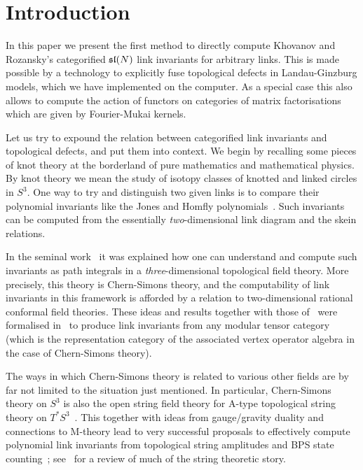\documentclass{compositio}
\theoremstyle{definition}
\numberwithin{equation}{section}
\begin{document}
\maketitle

\section{Introduction}

In this paper we present the first method to directly compute Khovanov and Rozansky's categorified $\mathfrak{sl}(N)$ link invariants for arbitrary links. This is made possible by a technology to explicitly fuse topological defects in Landau-Ginzburg models, which we have implemented on the computer. As a special case this also allows to compute the action of functors on categories of matrix factorisations which are given by Fourier-Mukai kernels. 

Let us try to expound the relation between categorified link invariants and topological defects, and put them into context. We begin by recalling some pieces of knot theory at the borderland of pure mathematics and mathematical physics. By knot theory we mean the study of isotopy classes of knotted and linked circles in $S^3$. One way to try and distinguish two given links is to compare their polynomial invariants like the Jones and Homfly polynomials~\cite{JonesPolynomialPaper, Homfly, HomflyPT}. Such invariants can be computed from the essentially \emph{two}-dimensional link diagram and the skein relations. 

In the seminal work~\cite{wittenjones} it was explained how one can understand and compute such invariants as path integrals in a \emph{three}-dimensional topological field theory. More precisely, this theory is Chern-Simons theory, and the computability of link invariants in this framework is afforded by a relation to two-dimensional rational conformal field theories. These ideas and results together with those of~\cite{t1988YB} were formalised in~\cite{RT1990, RT1991, turaevbook} to produce link invariants from any modular tensor category (which is the representation category of the associated vertex operator algebra in the case of Chern-Simons theory). 

The ways in which Chern-Simons theory is related to various other fields are by far not limited to the situation just mentioned. In particular, Chern-Simons theory on $S^3$ is also the open string field theory for A-type topological string theory on $T^*S^3$~\cite{w9207094}. This together with ideas from gauge/gravity duality and connections to M-theory lead to very successful proposals to effectively compute polynomial link invariants from topological string amplitudes and BPS state counting~\cite{gv9811131, ov9912123, lmv0010102}; see~\cite{marinoknotbook} for a review of much of the string theoretic story. 
\end{document}
